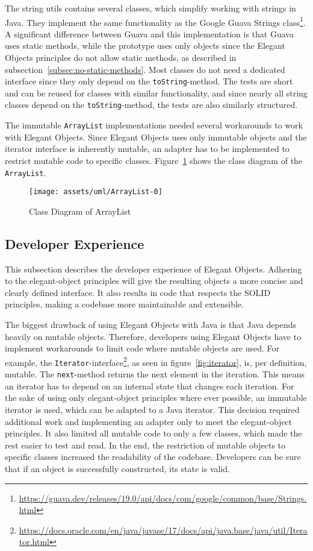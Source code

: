 The string utils contains several classes, which simplify working with strings in Java.
They implement the same functionality as the Google Guava Strings class\footnote{\url{https://guava.dev/releases/19.0/api/docs/com/google/common/base/Strings.html}}.
A significant difference between Guava and this implementation is that Guava uses static methods, while the prototype uses only objects since the Elegant Objects principles do not allow static methods, as described in subsection\ \ref{subsec:no-static-methods}.
Most classes do not need a dedicated interface since they only depend on the \texttt{toString}-method.
The tests are short and can be reused for classes with similar functionality, and since nearly all string classes depend on the \texttt{toString}-method, the tests are also similarly structured.

The immutable \texttt{ArrayList} implementations needed several workarounds to work with Elegant Objects.
Since Elegant Objects uses only immutable objects and the iterator interface is inherently mutable, an adapter has to be implemented to restrict mutable code to specific classes.
Figure\ \ref{fig:arraylist-class-diagram} shows the class diagram of the \texttt{ArrayList}.

\begin{figure}[h]
    \caption{Class Diagram of ArrayList}
    \texttt{[image: assets/uml/ArrayList-0]}
    \label{fig:arraylist-class-diagram}
\end{figure}

\subsection{Developer Experience}\label{subsec:developer-experience}
This subsection describes the developer experience of Elegant Objects.
Adhering to the elegant-object principles will give the resulting objects a more concise and clearly defined interface.
It also results in code that respects the SOLID principles, making a codebase more maintainable and extensible.

The biggest drawback of using Elegant Objects with Java is that Java depends heavily on mutable objects.
Therefore, developers using Elegant Objects have to implement workarounds to limit code where mutable objects are used.
For example, the \texttt{Iterator}-interface\footnote{\url{https://docs.oracle.com/en/java/javase/17/docs/api/java.base/java/util/Iterator.html}}, as seen in figure\ \ref{fig:iterator}, is, per definition, mutable.
The \texttt{next}-method returns the next element in the iteration.
This means an iterator has to depend on an internal state that changes each iteration.
For the sake of using only elegant-object principles where ever possible, an immutable iterator is used, which can be adapted to a Java iterator.
This decision required additional work and implementing an adapter only to meet the elegant-object principles.
It also limited all mutable code to only a few classes, which made the rest easier to test and read.
In the end, the restriction of mutable objects to specific classes increased the readability of the codebase.
Developers can be sure that if an object is successfully constructed, its state is valid.

